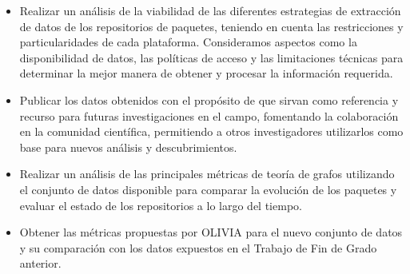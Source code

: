 
\begin{itemize}
    \item Realizar un análisis de la viabilidad de las diferentes estrategias de extracción de datos de los repositorios de paquetes, teniendo en cuenta las restricciones y particularidades de cada plataforma. Consideramos aspectos como la disponibilidad de datos, las políticas de acceso y las limitaciones técnicas para determinar la mejor manera de obtener y procesar la información requerida.
    \item Publicar los datos obtenidos con el propósito de que sirvan como referencia y recurso para futuras investigaciones en el campo, fomentando la colaboración en la comunidad científica, permitiendo a otros investigadores utilizarlos como base para nuevos análisis y descubrimientos.
    \item Realizar un análisis de las principales métricas de teoría de grafos utilizando el conjunto de datos disponible para comparar la evolución de los paquetes y evaluar el estado de los repositorios a lo largo del tiempo.
    \item Obtener las métricas propuestas por OLIVIA para el nuevo conjunto de datos y su comparación con los datos expuestos en el Trabajo de Fin de Grado anterior.
    \end{itemize}